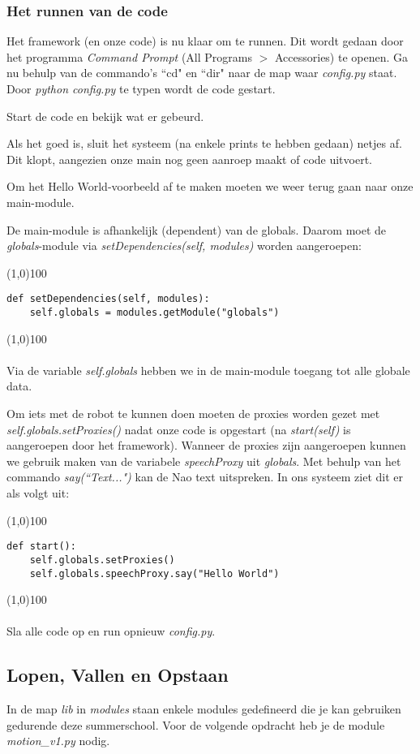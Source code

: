 \documentclass[a4paper]{article}
\begin{document}
\subsubsection{Het runnen van de code}
Het framework (en onze code) is nu klaar om te runnen. Dit wordt gedaan door het programma \textit{Command Prompt} (All Programs $>$ Accessories) te openen. 
Ga nu behulp van de commando's ``cd"  en ``dir" naar de map waar \textit{config.py} staat.
Door \textit{python config.py} te typen wordt de code gestart.

Start de code en bekijk wat er gebeurd.

Als het goed is, sluit het systeem (na enkele prints te hebben gedaan) netjes af. Dit klopt, aangezien onze main nog geen aanroep maakt of code uitvoert.

Om het Hello World-voorbeeld af te maken moeten we weer terug gaan naar onze main-module.

De main-module is afhankelijk (dependent) van de globals. Daarom moet de \textit{globals}-module via \textit{setDependencies(self, modules)} worden aangeroepen:

\noindent \line(1,0){100}
\begin{verbatim}
def setDependencies(self, modules):
    self.globals = modules.getModule("globals")
\end{verbatim}
\noindent \line(1,0){100}
\\\\
Via de variable \textit{self.globals} hebben we in de main-module toegang tot alle globale data.

Om iets met de robot te kunnen doen moeten de proxies worden gezet met \textit{self.globals.setProxies()} nadat onze code is opgestart (na \textit{start(self)} is aangeroepen door het framework).
Wanneer de proxies zijn aangeroepen kunnen we gebruik maken van de variabele \textit{speechProxy} uit \textit{globals}.
Met behulp van het commando \textit{say(``Text...")} kan de Nao text uitspreken. In ons systeem ziet dit er als volgt uit:

\noindent \line(1,0){100}
\begin{verbatim}
def start():
    self.globals.setProxies()
    self.globals.speechProxy.say("Hello World")
\end{verbatim}
\noindent \line(1,0){100}
\\\\
Sla alle code op en run opnieuw \textit{config.py}.

\subsection{Lopen, Vallen en Opstaan}
In de map \textit{lib} in \textit{modules} staan enkele modules gedefineerd die je kan gebruiken gedurende deze summerschool.
Voor de volgende opdracht heb je de module \textit{motion\_v1.py} nodig.
\end{document}
